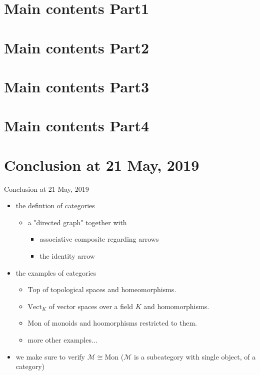\documentclass[dvipdfmx,10pt,notheorems]{beamer}
\renewcommand{\#}{^\sharp}
\begin{document}
\section{Main contents Part1}






\section{Main contents Part2}







\section{Main contents Part3}






\section{Main contents Part4}






\section{Conclusion at 21 May, 2019}
	\begin{frame}{Conclusion at 21 May, 2019}
		\begin{itemize}
 			\item the defintion of categories
					\begin{itemize}
							\item a "directed graph" together with
									\begin{itemize}
											\item associative composite regarding arrows
											\item the identity arrow
									\end{itemize}
					\end{itemize}
			\item the examples of categories
					\begin{itemize}
							\item $\mathrm{Top}$ of topological spaces and homeomorphisms.
							\item $\mathrm{Vect}_K$ of vector spaces over a field $K$ and homomorphisms.
							\item $\mathrm{Mon}$ of monoids and hoomorphisms restricted to them.
							\item more other examples...
					\end{itemize}
			\item we make sure to verify
			$\mathcal{M}\cong\mathrm{Mon}$ ($\mathcal{M}$ is a subcategory with single object,
			of a category)
		\end{itemize}
	\end{frame}
\end{document}
